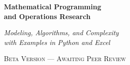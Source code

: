 
\begin{titlepage}
\thispagestyle{empty}
\begingroup
\pagecolor{white}
\centering

\vspace*{0.55in}

{\fontsize{30}{36}\selectfont\bfseries
  Mathematical Programming\\[2pt]
  and Operations Research\par}

\vspace{0.25in}

{\fontsize{14}{18}\selectfont\itshape
  Modeling, Algorithms, and Complexity\\
  with Examples in Python and Excel\par}

\vspace{0.2in}

{%
 \fontsize{11}{14}\selectfont\scshape\color{chaptertitlecolour}
  Beta Version --- Awaiting Peer Review\par}

\vspace{0.3in}

\end{titlepage}
